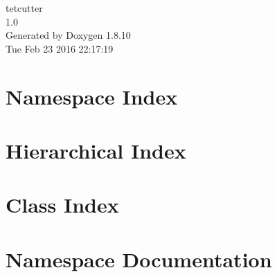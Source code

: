 \documentclass[twoside]{book}
\newcommand{\+}{\discretionary{\mbox{\scriptsize$\hookleftarrow$}}{}{}}
\newcommand{\clearemptydoublepage}{%
  \newpage{\pagestyle{empty}\cleardoublepage}%
}
\begin{document}
\hypersetup{pageanchor=false,
             bookmarks=true,
             bookmarksnumbered=true,
             pdfencoding=unicode
            }
\begin{titlepage}
\vspace*{7cm}
\begin{center}%
{\Large tetcutter \\[1ex]\large 1.\+0 }\\
\vspace*{1cm}
{\large Generated by Doxygen 1.8.10}\\
\vspace*{0.5cm}
{\small Tue Feb 23 2016 22:17:19}\\
\end{center}
\end{titlepage}
\clearemptydoublepage
\tableofcontents
\clearemptydoublepage
{}
\hypersetup{pageanchor=true}

\chapter{Namespace Index}

\chapter{Hierarchical Index}

\chapter{Class Index}

\chapter{Namespace Documentation}

\end{document}
